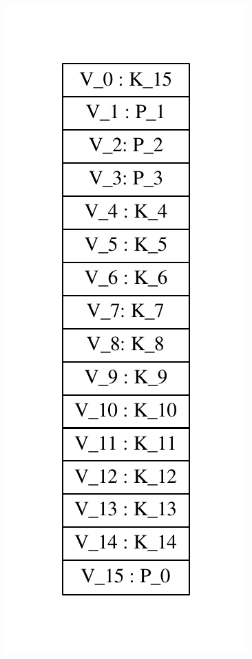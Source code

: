 \documentclass[]{article}
\begin{document}
\includegraphics{graphviz-images/d0b0d4aa89a691fbd2ceed7a05160c25c93500f4.pdf}
\end{document}
